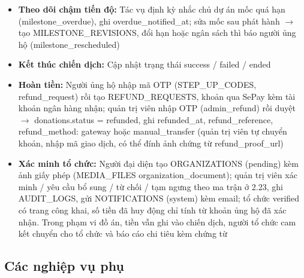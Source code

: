 \begin{itemize}
    \item \textbf{Theo dõi chậm tiến độ:} Tác vụ định kỳ nhắc chủ dự án mốc quá hạn (milestone\_\allowbreak{}overdue), ghi overdue\_\allowbreak{}notified\_\allowbreak{}at; sửa mốc sau phát hành $\rightarrow$ tạo MILESTONE\_\allowbreak{}REVISIONS, đổi hạn hoặc ngân sách thì báo người ủng hộ (milestone\_\allowbreak{}rescheduled)
    \item \textbf{Kết thúc chiến dịch:} Cập nhật trạng thái success / failed / ended
    \item \textbf{Hoàn tiền:} Người ủng hộ nhập mã OTP (STEP\_\allowbreak{}UP\_\allowbreak{}CODES, refund\_\allowbreak{}request) rồi tạo REFUND\_\allowbreak{}REQUESTS, khoản qua SePay kèm tài khoản ngân hàng nhận; quản trị viên nhập OTP (admin\_\allowbreak{}refund) rồi duyệt $\rightarrow$ donations.status = refunded, ghi refunded\_\allowbreak{}at, refund\_\allowbreak{}reference, refund\_\allowbreak{}method: gateway hoặc manual\_\allowbreak{}transfer (quản trị viên tự chuyển khoản, nhập mã giao dịch, có thể đính ảnh chứng từ refund\_\allowbreak{}proof\_\allowbreak{}url)
    \item \textbf{Xác minh tổ chức:} Người đại diện tạo ORGANIZATIONS (pending) kèm ảnh giấy phép (MEDIA\_\allowbreak{}FILES organization\_\allowbreak{}document); quản trị viên xác minh / yêu cầu bổ sung / từ chối / tạm ngưng theo ma trận ở 2.23, ghi AUDIT\_\allowbreak{}LOGS, gửi NOTIFICATIONS (system) kèm email; tổ chức verified có trang công khai, số tiền đã huy động chỉ tính từ khoản ủng hộ đã xác nhận. Trong phạm vi đồ án, tiền vẫn ghi vào chiến dịch, người tổ chức cam kết chuyển cho tổ chức và báo cáo chi tiêu kèm chứng từ
\end{itemize}

\subsection{Các nghiệp vụ phụ}

